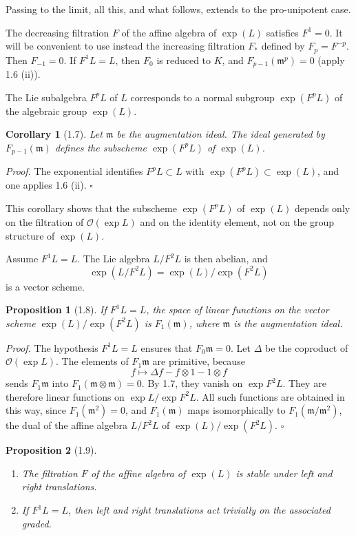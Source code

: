 \documentclass[10pt,a4paper]{article}
\newcommand{\OO}{\mathcal O}
\newcommand{\m}{\mathfrak m}
\theoremstyle{deligne}
\newtheorem*{proposition*}{Proposition}
\newtheorem*{corollary*}{Corollary}
\newenvironment{proofdel}{\textit{Proof.}}{\hfill$\square$}
\begin{document}
Passing to the limit, all this, and what follows, extends to the pro-unipotent case.

The decreasing filtration \(F\) of the affine algebra of \(\exp(L)\) satisfies \(F^1=0\). It will be convenient to use instead the increasing filtration \(F_*\) defined by \(F_p=F^{-p}\). Then \(F_{-1}=0\). If \(F^1L=L\), then \(F_0\) is reduced to \(K\), and \(F_{p-1}(\m^p)=0\) (apply 1.6 (ii)).

The Lie subalgebra \(F^pL\) of \(L\) corresponds to a normal subgroup \(\exp(F^pL)\) of the algebraic group \(\exp(L)\).

\begin{corollary*}[1.7]
Let \(\m\) be the augmentation ideal. The ideal generated by \(F_{p-1}(\m)\) defines the subscheme \(\exp(F^pL)\) of \(\exp(L)\).
\end{corollary*}

\begin{proofdel}
The exponential identifies \(F^pL\subset L\) with \(\exp(F^pL)\subset\exp(L)\), and one applies 1.6 (ii).
\end{proofdel}

This corollary shows that the subscheme \(\exp(F^pL)\) of \(\exp(L)\) depends only on the filtration of \(\OO(\exp L)\) and on the identity element, not on the group structure of \(\exp(L)\).

Assume \(F^1L=L\). The Lie algebra \(L/F^2L\) is then abelian, and
\[
\exp(L/F^2L)=\exp(L)/\exp(F^2L)
\]
is a vector scheme.

\begin{proposition*}[1.8]
If \(F^1L=L\), the space of linear functions on the vector scheme \(\exp(L)/\exp(F^2L)\) is \(F_1(\m)\), where \(\m\) is the augmentation ideal.
\end{proposition*}

\begin{proofdel}
The hypothesis \(F^1L=L\) ensures that \(F_0\m=0\). Let \(\Delta\) be the coproduct of \(\OO(\exp L)\). The elements of \(F_1\m\) are primitive, because
\[
f\longmapsto \Delta f-f\otimes1-1\otimes f
\]
sends \(F_1\m\) into \(F_1(\m\otimes\m)=0\). By 1.7, they vanish on \(\exp F^2L\). They are therefore linear functions on \(\exp L/\exp F^2L\). All such functions are obtained in this way, since \(F_1(\m^2)=0\), and \(F_1(\m)\) maps isomorphically to \(F_1(\m/\m^2)\), the dual of the affine algebra \(L/F^2L\) of \(\exp(L)/\exp(F^2L)\).
\end{proofdel}

\begin{proposition*}[1.9]
\begin{enumerate}[label=(\roman*)]
\item The filtration \(F\) of the affine algebra of \(\exp(L)\) is stable under left and right translations.
\item If \(F^1L=L\), then left and right translations act trivially on the associated graded.
\end{enumerate}
\end{proposition*}
\end{document}
